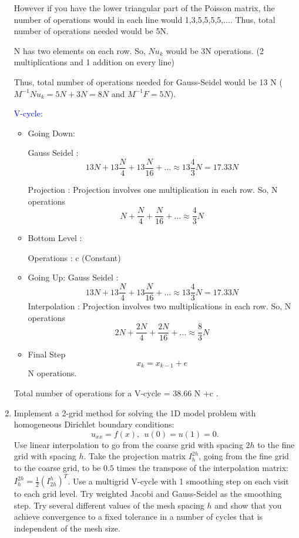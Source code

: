\documentclass[letterpaper,12pt]{article}
\begin{document}
\begin{enumerate}
However if you have the lower triangular part of the Poisson matrix, the number of operations would in each line would 1,3,5,5,5,5,.... Thus, total number of operations needed would be 5N.
 
N has two elements on each row. So, $Nu_k$ would be 3N operations. (2 multiplications and 1 addition on every line) 
 
 Thus, total number of operations needed for Gauss-Seidel would be 13 N ($M^{-1}Nu_k = 5N +3N= 8 N$ and $M^{-1}F = 5N$).
 
\textcolor{blue}{V-cycle:} 
\begin{itemize}
\item 
Going Down:

Gauss Seidel : 
\[13N + 13\frac{N}{4}+13\frac{N}{16}+ \ldots \approx  13\frac{4}{3}N = 17.33N\]


Projection :
Projection involves one multiplication in each row. So, N operations
\[N + \frac{N}{4}+\frac{N}{16}+ \ldots \approx  \frac{4}{3}N \]
\item
Bottom Level :

Operations : c (Constant)

\item Going Up:
Gauss Seidel : 
\[13N + 13\frac{N}{4}+13\frac{N}{16}+ \ldots \approx  13\frac{4}{3}N = 17.33N\]
Interpolation :
Projection involves two multiplications in each row. So, N operations
\[2N + \frac{2N}{4}+\frac{2N}{16}+ \ldots \approx  \frac{8}{3}N \] 
\item
Final Step
\[x_k = x_{k-1}+e\]
N operations.
\end{itemize}


Total number of operations for a V-cycle = 38.66 N +c
 .


\item
Implement a 2-grid method for solving the 1D model problem with homogeneous Dirichlet
boundary conditions:
\[
u_{xx} = f(x) ,~~u(0) = u(1) = 0.
\]
Use linear interpolation to go from the coarse grid with spacing $2h$ to the fine grid
with spacing $h$.  Take the projection matrix $I_h^{2h}$, going from the fine grid to the
coarse grid, to be $0.5$ times the transpose of the interpolation matrix: 
$I_h^{2h} = \frac{1}{2} ( I_{2h}^h )^T$.
Use a multigrid V-cycle with 1 smoothing step on each visit to each grid level. 
Try weighted Jacobi and Gauss-Seidel as the smoothing step.
Try several different values of the mesh spacing $h$ and show that you achieve convergence to
a fixed tolerance in a number of cycles that is independent of the mesh size.


\end{enumerate}
\end{document}
